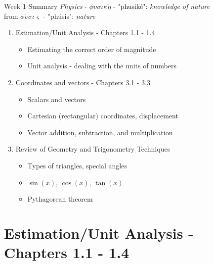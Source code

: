 \documentclass{beamer}
\begin{document}
\begin{frame}{Week 1 Summary}
\textit{Physics} - $\phi\upsilon\sigma\iota\kappa\acute{\eta}$ - "phusik\'e": \textit{knowledge of nature} \\
from $\phi\acute{\upsilon}\sigma\iota\varsigma$ - "ph\'usis": \textit{nature}
\begin{enumerate}
\item Estimation/Unit Analysis - Chapters 1.1 - 1.4
\begin{itemize}
\item \alert{Estimating} the correct order of magnitude
\item \alert{Unit analysis} - dealing with the units of numbers
\end{itemize}
\item Coordinates and vectors - Chapters 3.1 - 3.3
\begin{itemize}
\item \alert{Scalars} and \alert{vectors}
\item \alert{Cartesian} (rectangular) coordinates, displacement
\item \alert{Vector} addition, subtraction, and multiplication
\end{itemize}
\item Review of Geometry and Trigonometry Techniques
\begin{itemize}
\item Types of \alert{triangles}, special angles
\item $\sin(x)$, $\cos(x)$, $\tan(x)$
\item Pythagorean theorem
\end{itemize}
\end{enumerate}
\end{frame}

\section{Estimation/Unit Analysis - Chapters 1.1 - 1.4}
\end{document}
